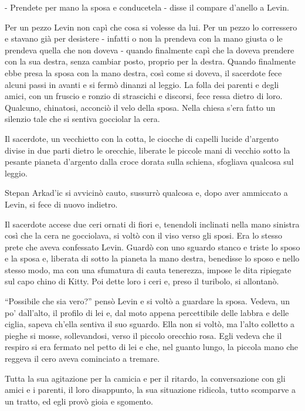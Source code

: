 - Prendete per mano la sposa e conducetela - disse il compare d'anello a Levin. 

Per un pezzo Levin non capì che cosa si volesse da lui. Per un pezzo lo corressero e stavano già per desistere - infatti o non la prendeva con la mano giusta o le prendeva quella che non doveva - quando finalmente capì che la doveva prendere con la sua destra, senza cambiar posto, proprio per la destra. Quando finalmente ebbe presa la sposa con la mano destra, così come si doveva, il sacerdote fece alcuni passi in avanti e si fermò dinanzi al leggio. La folla dei parenti e degli amici, con un fruscio e ronzio di strascichi e discorsi, fece ressa dietro di loro. Qualcuno, chinatosi, acconciò il velo della sposa. Nella chiesa s'era fatto un silenzio tale che si sentiva gocciolar la cera. 

Il sacerdote, un vecchietto con la cotta, le ciocche di capelli lucide d'argento divise in due parti dietro le orecchie, liberate le piccole mani di vecchio sotto la pesante pianeta d'argento dalla croce dorata sulla schiena, sfogliava qualcosa sul leggio. 

Stepan Arkad'ic si avvicinò cauto, sussurrò qualcosa e, dopo aver ammiccato a Levin, si fece di nuovo indietro. 

Il sacerdote accese due ceri ornati di fiori e, tenendoli inclinati nella mano sinistra così che la cera ne gocciolava, si voltò con il viso verso gli sposi. Era lo stesso prete che aveva confessato Levin. Guardò con uno sguardo stanco e triste lo sposo e la sposa e, liberata di sotto la pianeta la mano destra, benedisse lo sposo e nello stesso modo, ma con una sfumatura di cauta tenerezza, impose le dita ripiegate sul capo chino di Kitty. Poi dette loro i ceri e, preso il turibolo, si allontanò. 

``Possibile che sia vero?'' pensò Levin e si voltò a guardare la sposa. Vedeva, un po' dall'alto, il profilo di lei e, dal moto appena percettibile delle labbra e delle ciglia, sapeva ch'ella sentiva il suo sguardo. Ella non si voltò, ma l'alto colletto a pieghe si mosse, sollevandosi, verso il piccolo orecchio rosa. Egli vedeva che il respiro si era fermato nel petto di lei e che, nel guanto lungo, la piccola mano che reggeva il cero aveva cominciato a tremare. 

Tutta la sua agitazione per la camicia e per il ritardo, la conversazione con gli amici e i parenti, il loro disappunto, la sua situazione ridicola, tutto scomparve a un tratto, ed egli provò gioia e sgomento. 

